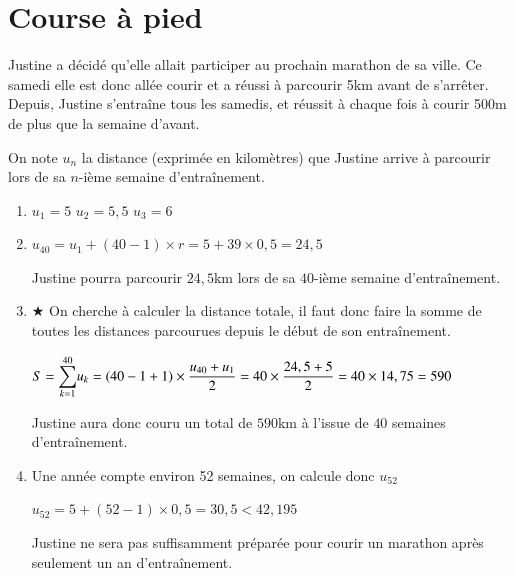 \documentclass[oneside,12pt]{exam}          %
\begin{document}
\newpage
\setcounter{section}{0}
\color{newblue}



\section{Course à pied}
Justine a décidé qu'elle allait participer au prochain marathon de sa ville. Ce samedi elle est donc allée courir et a réussi à parcourir 5km avant de s'arrêter. Depuis, Justine s'entraîne tous les samedis, et réussit à chaque fois à courir 500m de plus que la semaine d'avant.

On note $u_n$ la distance (exprimée en kilomètres) que Justine arrive à parcourir lors de sa $n$-ième semaine d'entraînement.
\begin{enumerate}
	\item $u_1 = 5$ \qquad $u_2 = 5,5$ \qquad $u_3 = 6$
	\item $u_{40} = u_1 + (40-1) \times r = 5 + 39 \times 0,5 = 24,5$
	
	Justine pourra parcourir $24,5$km lors de sa $40$-ième semaine d'entraînement.
	\item $\bigstar$ On cherche à calculer la distance totale, il faut donc faire la somme de toutes les distances parcourues depuis le début de son entraînement.
	
	$S = {\displaystyle\sum_{k=1}^{40}} u_k = (40 - 1 + 1) \times \dfrac{u_{40} + u_1}{2} = 40 \times \dfrac{24,5+5}{2} = 40 \times 14,75 = 590$
	
	Justine aura donc couru un total de $590$km à l'issue de $40$ semaines d'entraînement.
	
	\item Une année compte environ 52 semaines, on calcule donc $u_{52}$
	
	$u_{52} = 5 + (52 - 1) \times 0,5 = 30,5 < 42,195$
	
	Justine ne sera pas suffisamment préparée pour courir un marathon après seulement un an d'entraînement.
\end{enumerate}
\end{document}
